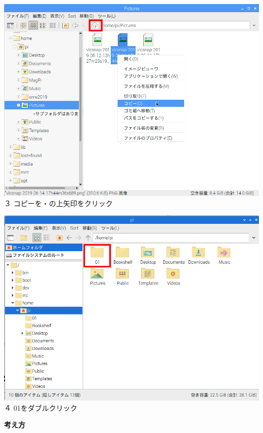 \documentclass[a4paper,12pt]{jarticle}
\begin{document}
\begin{minipage}{0.45\linewidth}
  \includegraphics[width=\linewidth]{textbook-img163.png}
  \newline
  ３
  コピーを・の上矢印をクリック
\end{minipage}
\hspace{10mm}
\begin{minipage}{0.45\linewidth}
  \includegraphics[width=\linewidth]{textbook-img167.png}
  \newline
  ４ 01をダブルクリック
\end{minipage}

\clearpage
\flushleft

\textbf{考え方}
\end{document}
